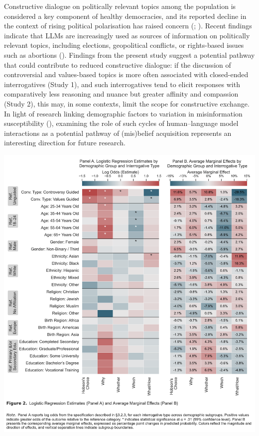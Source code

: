 \documentclass[
  12pt,
]{article}
\begin{document}
Constructive dialogue on politically relevant topics among the population is considered a key component of healthy democracies, and its reported decline in the context of rising political polarisation has raised concern (; ). Recent findings indicate that LLMs are increasingly used as sources of information on politically relevant topics, including elections, geopolitical conflicts, or rights-based issues such as abortions (). Findings from the present study suggest a potential pathway that could contribute to reduced constructive dialogue: if the discussion of controversial and values-based topics is more often associated with closed-ended interrogatives (Study 1), and such interrogatives tend to elicit responses with comparatively less reasoning and nuance but greater affinity and compassion (Study 2), this may, in some contexts, limit the scope for constructive exchange. In light of research linking demographic factors to variation in misinformation susceptibility (), examining the role of such cycles of human--language model interactions as a potential pathway of (mis)belief acquisition represents an interesting direction for future research.

\includegraphics{../03_outputs/02_descriptive_analyses/figure_2.pdf}
\end{document}

